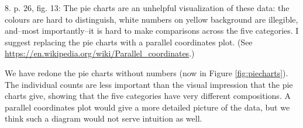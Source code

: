 
\begin{mdframed}[backgroundcolor=orange!10]
8. p. 26, fig. 13: The pie charts are an unhelpful visualization of these data: the colours are hard to distinguish, white numbers on yellow background are illegible, and--most importantly--it is hard to make comparisons across the five categories. I suggest replacing the pie charts with a parallel coordinates plot. (See \url{https://en.wikipedia.org/wiki/Parallel_coordinates}.)
\end{mdframed}

We have redone the pie charts without numbers (now in Figure
\ref{fig:piecharts}).  The individual counts are less important than
the visual impression that the pie charts give, showing that the five
categories have very different compositions.  A parallel coordinates
plot would give a more detailed picture of the data, but we think such
a diagram would not serve intuition as well.





